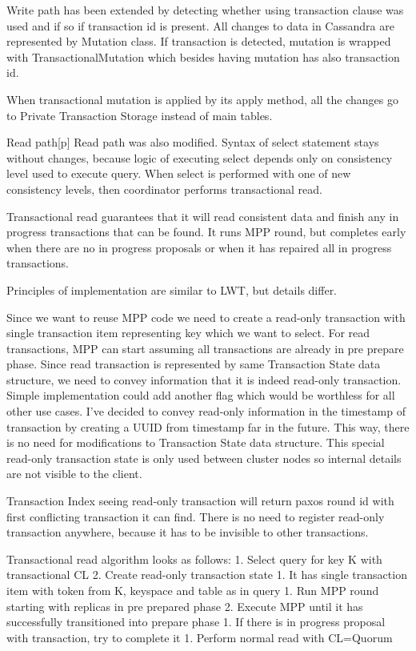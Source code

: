 Write path has been extended by detecting whether using transaction clause was used and if so if transaction id is present. All changes to data in Cassandra are represented by Mutation class. If transaction is detected, mutation is wrapped with TransactionalMutation which besides having mutation has also transaction id.


When transactional mutation is applied by its apply method, all the changes go to Private Transaction Storage instead of main tables.


Read path[p]
Read path was also modified. Syntax of select statement stays without changes, because logic of executing select depends only on consistency level used to execute query.  When select is performed with one of new consistency levels, then coordinator performs transactional read.


Transactional read guarantees that it will read consistent data and finish any in progress transactions that can be found. It runs MPP round, but completes early when there are no in progress proposals or when it has repaired all in progress transactions.


Principles of implementation are similar to LWT, but details differ.


Since we want to reuse MPP code we need to create a read-only transaction with single transaction item representing key which we want to select. For read transactions, MPP can start assuming all transactions are already in pre prepare phase. Since read transaction is represented by same Transaction State data structure, we need to convey information that it is indeed read-only transaction. Simple implementation could add another flag which would be worthless for all other use cases. I’ve decided to convey read-only information in the timestamp of transaction by creating a UUID from timestamp far in the future. This way, there is no need for modifications to Transaction State data structure. This special read-only transaction state is only used between cluster nodes so internal details are not visible to the client.


Transaction Index seeing read-only transaction will return paxos round id with first conflicting transaction it can find. There is no need to register read-only transaction anywhere, because it has to be invisible to other transactions.


Transactional read algorithm looks as follows:
1. Select query for key K with transactional CL
2. Create read-only transaction state
   1. It has single transaction item with token from K, keyspace and table as in query
1. Run MPP round starting with replicas in pre prepared phase
2. Execute MPP until it has successfully transitioned into prepare phase
   1. If there is in progress proposal with transaction, try to complete it
1. Perform normal read with CL=Quorum


